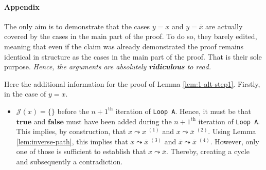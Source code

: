 \documentclass [11pt]{article}
\newcommand{\True}{\mathbf{true}}
\newcommand{\False}{\mathbf{false}}
\newcommand{\reach}{\leadsto}
\begin{document}
\newpage
\paragraph*{Appendix}



The only aim is to demonstrate that the cases $y=x$ and $y = \overline{x}$ are actually covered by the cases in the main part of the proof. To do so, they barely edited, meaning that even if the claim was already demonstrated the proof remains identical in structure as the cases in the main part of the proof. That is their sole purpose. \emph{Hence, the arguments are absolutely \textbf{ridiculous} to read.}

\bigskip
Here the additional information for the proof of Lemma \ref{lem:1-alt-step1}. Firstly, in the case of $y=x$.
\begin{itemize}
\item $\mathcal{J}(x)=\{\}$ before the $n+1^{\text{th}}$ iteration of \texttt{Loop A}. Hence, it must be that $\True$ and $\False$  must have been added during the $n+1^{\text{th}}$ iteration of \texttt{Loop A}. This implies, by construction, that $x \reach x\; ^{(1)}$ and $x \reach \overline{x}\; ^{(2)}$. Using Lemma \ref{lem:inverse-path}, this implies that $x \reach \overline{x}\;^{(3)}$ and $\overline{x} \reach \overline{x}\;^{(4)}$. However, only one of those is sufficient to establish that $x \reach \overline{x}$. Thereby, creating a cycle and subsequently a contradiction. 

\begin{center}
\end{center}
\end{itemize}
\end{document}
